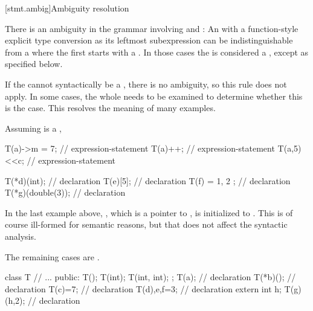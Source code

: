 [stmt.ambig]{Ambiguity resolution}%

\pnum
There is an ambiguity in the grammar involving
 and : An
 with a function-style explicit type
conversion as its leftmost subexpression can be
indistinguishable from a  where the first
 starts with a \tcode{(}. In those cases the
 is considered a ,
except as specified below.

\pnum
\begin{note}
If the  cannot syntactically be a
, there is no ambiguity,
so this rule does not apply.
In some cases, the whole  needs to be examined
to determine whether this is the case. This resolves the meaning
of many examples.
\begin{example}
Assuming  is a
,

\begin{codeblock}
T(a)->m = 7;        // expression-statement
T(a)++;             // expression-statement
T(a,5)<<c;          // expression-statement

T(*d)(int);         //  declaration
T(e)[5];            //  declaration
T(f) = { 1, 2 };    //  declaration
T(*g)(double(3));   //  declaration
\end{codeblock}

In the last example above, , which is a pointer to ,
is initialized to . This is of course ill-formed for
semantic reasons, but that does not affect the syntactic analysis.
\end{example}

The remaining cases are .
\begin{example}
\begin{codeblock}
class T {
  // ...
public:
  T();
  T(int);
  T(int, int);
};
T(a);               //  declaration
T(*b)();            //  declaration
T(c)=7;             //  declaration
T(d),e,f=3;         //  declaration
extern int h;
T(g)(h,2);          //  declaration
\end{codeblock}
\end{example}
\end{note}

